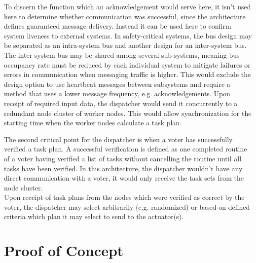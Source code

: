 To discern the function which an acknowledgement would serve here, it isn't used here to determine whether communication was successful, since the architecture defines guaranteed message delivery. Instead it can be used here to confirm system liveness to external systems. In safety-critical systems, the bus design may be separated as an intra-system bus and another design for an inter-system bus. The inter-system bus may be shared among several sub-systems, meaning bus occupancy rate must be reduced by each individual system to mitigate failures or errors in communication when messaging traffic is higher. This would exclude the design option to use heartbeat messages between subsystems and require a method that uses a lower message frequency, e.g. acknowledgements.
Upon receipt of required input data, the dispatcher would send it concurrently to a redundant node cluster of worker nodes. This would allow synchronization for the starting time when the worker nodes calculate a task plan.

The second critical point for the dispatcher is when a voter has successfully verified a task plan. A successful verification is defined as one completed routine of a voter having verified a list of tasks without cancelling the routine until all tasks have been verified. In this architecture, the dispatcher wouldn't have any direct communication with a voter, it would only receive the task sets from the node cluster.
\\
Upon receipt of task plans from the nodes which were verified as correct by the voter, the dispatcher may select arbitrarily (e.g. randomized) or based on defined criteria which plan it may select to send to the actuator(s).


\section{Proof of Concept}
